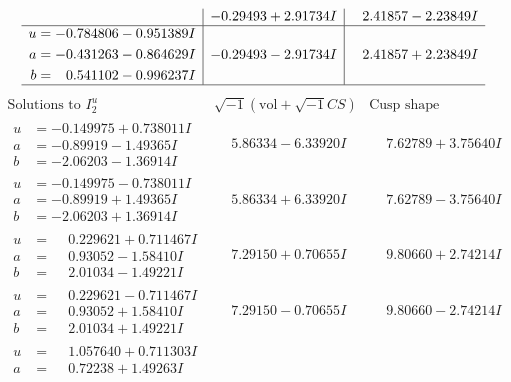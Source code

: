 \documentclass[1p]{elsarticle_modified}
\theoremstyle{definition}
\newcommand{\I}{\sqrt{-1}}
\begin{document}
$$\begin{array}{c|c|c}
 & -0.29493 + 2.91734 I & \phantom{-}2.41857 - 2.23849 I \\ \hline\begin{aligned}
u &= -0.784806 - 0.951389 I \\
a &= -0.431263 - 0.864629 I \\
b &= \phantom{-}0.541102 - 0.996237 I\end{aligned}
 & -0.29493 - 2.91734 I & \phantom{-}2.41857 + 2.23849 I\\
 \hline 
 \end{array}$$\newpage$$\begin{array}{c|c|c}  
\text{Solutions to }I^u_{2}& \I (\text{vol} + \sqrt{-1}CS) & \text{Cusp shape}\\
 \hline 
\begin{aligned}
u &= -0.149975 + 0.738011 I \\
a &= -0.89919 - 1.49365 I \\
b &= -2.06203 - 1.36914 I\end{aligned}
 & \phantom{-}5.86334 - 6.33920 I & \phantom{-}7.62789 + 3.75640 I \\ \hline\begin{aligned}
u &= -0.149975 - 0.738011 I \\
a &= -0.89919 + 1.49365 I \\
b &= -2.06203 + 1.36914 I\end{aligned}
 & \phantom{-}5.86334 + 6.33920 I & \phantom{-}7.62789 - 3.75640 I \\ \hline\begin{aligned}
u &= \phantom{-}0.229621 + 0.711467 I \\
a &= \phantom{-}0.93052 - 1.58410 I \\
b &= \phantom{-}2.01034 - 1.49221 I\end{aligned}
 & \phantom{-}7.29150 + 0.70655 I & \phantom{-}9.80660 + 2.74214 I \\ \hline\begin{aligned}
u &= \phantom{-}0.229621 - 0.711467 I \\
a &= \phantom{-}0.93052 + 1.58410 I \\
b &= \phantom{-}2.01034 + 1.49221 I\end{aligned}
 & \phantom{-}7.29150 - 0.70655 I & \phantom{-}9.80660 - 2.74214 I \\ \hline\begin{aligned}
u &= \phantom{-}1.057640 + 0.711303 I \\
a &= \phantom{-}0.72238 + 1.49263 I \\

\end{aligned}
\end{array}$$
\end{document}
